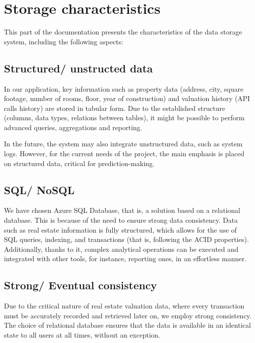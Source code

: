 \documentclass{article}
\begin{document}
\section{Storage characteristics}

This part of the documentation presents the characteristics of the data storage system, including the following aspects:

\subsection{Structured/ unstructed data}

In our application, key information such as property data (address, city, square footage, number of rooms, floor, year of construction) and valuation history (API calls history) are stored in tabular form. Due to the established structure (columns, data types, relations between tables), it might be possible to perform advanced queries, aggregations and reporting.

In the future, the system may also integrate unstructured data, such as system logs. However, for the current needs of the project, the main emphasis is placed on structured data, critical for prediction-making. 

\subsection{SQL/ NoSQL}

We have chosen Azure SQL Database, that is, a solution based on a relational database. This is because of the need to ensure strong data consistency. Data such as real estate information is fully structured, which allows for the use of SQL queries, indexing, and transactions (that is, following the ACID properties). Additionally, thanks to it, complex analytical operations can be executed and integrated with other tools, for instance, reporting ones, in an effortless manner. 


\subsection{Strong/ Eventual consistency}

Due to the critical nature of real estate valuation data, where every transaction must be accurately recorded and retrieved later on, we employ strong consistency. The choice of relational database ensures that the data is available in an identical state to all users at all times, without an exception.
\end{document}
